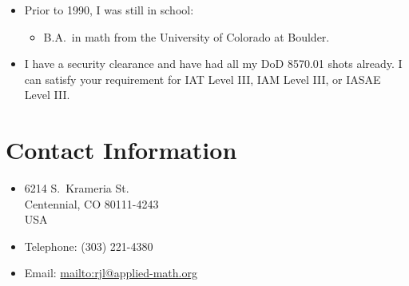 \documentclass[12pt,letterpaper]{article}
\begin{document}
\begin{itemize}
	\item Prior to 1990, I was still in school:
		\begin{itemize}
			\item B.A.\ in math from the University of Colorado at Boulder.
		\end{itemize}

	\item I have a security clearance and have had all my DoD 8570.01 shots already.
		I can satisfy your requirement for IAT Level III, IAM Level III, or IASAE Level III.
		
\end{itemize}

\section*{Contact Information}

\begin{itemize}
	\item 6214 S.\ Krameria St. \\
		Centennial, CO 80111-4243 \\
		USA

	\item Telephone: (303) 221-4380

	\item Email: \url{mailto:rjl@applied-math.org}
\end{itemize}

\vfill{}
\end{document}
